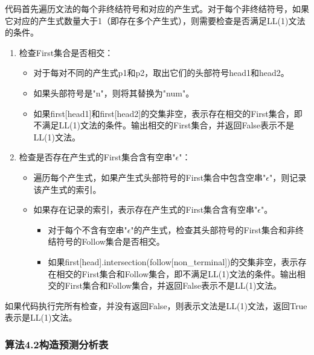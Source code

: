 \documentclass[lang=cn,11pt,a4paper]{elegantpaper}
\begin{document}
代码首先遍历文法的每个非终结符号和对应的产生式。对于每个非终结符号，如果它对应的产生式数量大于1（即存在多个产生式），则需要检查是否满足LL(1)文法的条件。
\begin{enumerate}
    \item 检查First集合是否相交：
    \begin{itemize}
        \item 对于每对不同的产生式p1和p2，取出它们的头部符号head1和head2。
        \item 如果头部符号是"n"，则将其替换为"num"。
        \item 如果first[head1]和first[head2]的交集非空，表示存在相交的First集合，即不满足LL(1)文法的条件。输出相交的First集合，并返回False表示不是LL(1)文法。
    \end{itemize}
    \item 检查是否存在产生式的First集合含有空串"$\epsilon$"：
    \begin{itemize}
        \item 遍历每个产生式，如果产生式头部符号的First集合中包含空串"$\epsilon$"，则记录该产生式的索引。
        \item 如果存在记录的索引，表示存在产生式的First集合含有空串"$\epsilon$"。
        \begin{itemize}
            \item 对于每个不含有空串"$\epsilon$"的产生式，检查其头部符号的First集合和非终结符号的Follow集合是否相交。
            \item 如果first[head].intersection(follow[non\_terminal])的交集非空，表示存在相交的First集合和Follow集合，即不满足LL(1)文法的条件。输出相交的First集合和Follow集合，并返回False表示不是LL(1)文法。
        \end{itemize}
    \end{itemize}
\end{enumerate}

如果代码执行完所有检查，并没有返回False，则表示文法是LL(1)文法，返回True表示是LL(1)文法。

\subsubsection{算法4.2构造预测分析表}
\end{document}
